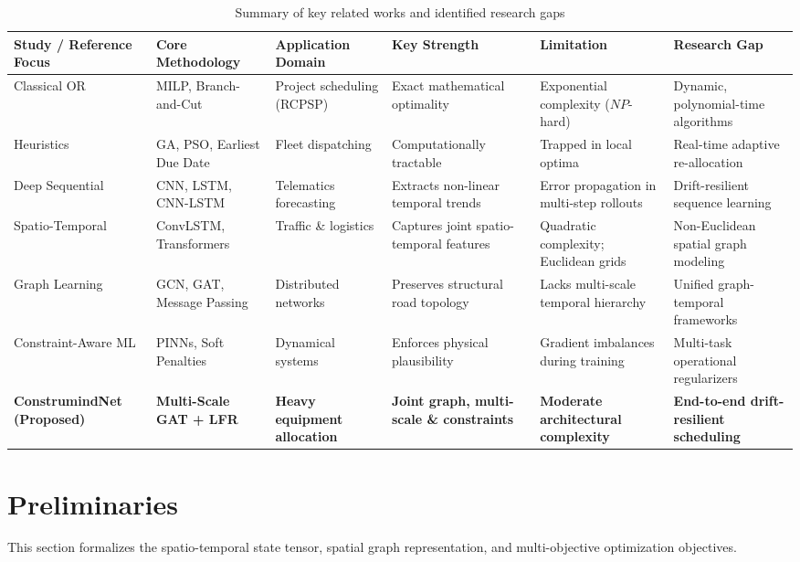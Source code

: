 \documentclass[pdflatex,sn-mathphys,Numbered]{sn-jnl}%
\begin{document}
\begin{table}[t]
\caption{Summary of key related works and identified research gaps}\label{tab1}
\begin{tabular*}{\textwidth}{@{\extracolsep\fill}llllll@{\extracolsep\fill}}
\toprule
Study / Reference Focus & Core Methodology & Application Domain & Key Strength & Limitation & Research Gap \\
\midrule
Classical OR \cite{hossain2025,meng2025} & MILP, Branch-and-Cut & Project scheduling (RCPSP) & Exact mathematical optimality & Exponential complexity ($NP$-hard) & Dynamic, polynomial-time algorithms \\
Heuristics \cite{ejiyi2025,nguyen2024} & GA, PSO, Earliest Due Date & Fleet dispatching & Computationally tractable & Trapped in local optima & Real-time adaptive re-allocation \\
Deep Sequential \cite{russo2025,inam2024} & CNN, LSTM, CNN-LSTM & Telematics forecasting & Extracts non-linear temporal trends & Error propagation in multi-step rollouts & Drift-resilient sequence learning \\
Spatio-Temporal \cite{shin2023,li2025} & ConvLSTM, Transformers & Traffic \& logistics & Captures joint spatio-temporal features & Quadratic complexity; Euclidean grids & Non-Euclidean spatial graph modeling \\
Graph Learning \cite{hussain2023,liu2025} & GCN, GAT, Message Passing & Distributed networks & Preserves structural road topology & Lacks multi-scale temporal hierarchy & Unified graph-temporal frameworks \\
Constraint-Aware ML \cite{meng2025,cuomo2022} & PINNs, Soft Penalties & Dynamical systems & Enforces physical plausibility & Gradient imbalances during training & Multi-task operational regularizers \\
\textbf{ConstrumindNet (Proposed)} & \textbf{Multi-Scale GAT + LFR} & \textbf{Heavy equipment allocation} & \textbf{Joint graph, multi-scale \& constraints} & \textbf{Moderate architectural complexity} & \textbf{End-to-end drift-resilient scheduling} \\
\bottomrule
\end{tabular*}
\end{table}

\section{Preliminaries}\label{sec3}
This section formalizes the spatio-temporal state tensor, spatial graph representation, and multi-objective optimization objectives.
\end{document}
